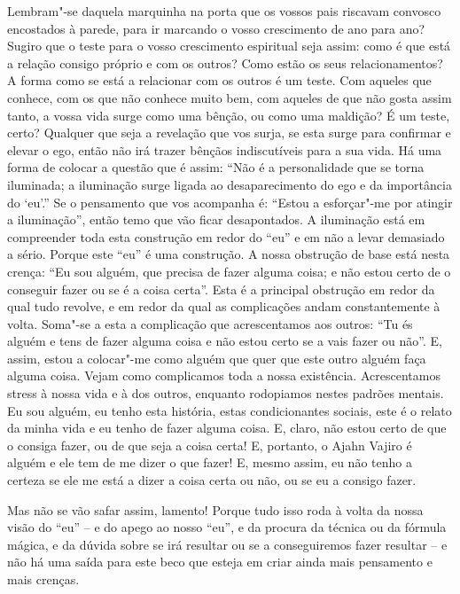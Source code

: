 Lembram"-se daquela marquinha na porta que os vossos pais riscavam convosco
encostados à parede, para ir marcando o vosso crescimento de ano para ano?
Sugiro que o teste para o vosso crescimento espiritual seja assim: como é que
está a relação consigo próprio e com os outros? Como estão os seus
relacionamentos? A forma como se está a relacionar com os outros é um teste. Com
aqueles que conhece, com os que não conhece muito bem, com aqueles de que não
gosta assim tanto, a vossa vida surge como uma bênção, ou como uma maldição? É
um teste, certo? Qualquer que seja a revelação que vos surja, se esta surge para
confirmar e elevar o ego, então não irá trazer bênçãos indiscutíveis para a sua
vida. Há uma forma de colocar a questão que é assim: ``Não é a personalidade que
se torna iluminada; a iluminação surge ligada ao desaparecimento do ego e da
importância do `eu'.'' Se o pensamento que vos acompanha é: ``Estou a
esforçar"-me por atingir a iluminação'', então temo que vão ficar desapontados. A
iluminação está em compreender toda esta construção em redor do ``eu'' e em não
a levar demasiado a sério. Porque este ``eu'' é uma construção. A nossa
obstrução de base está nesta crença: ``Eu sou alguém, que precisa de fazer
alguma coisa; e não estou certo de o conseguir fazer ou se é a coisa certa''.
Esta é a principal obstrução em redor da qual tudo revolve, e em redor da qual
as complicações andam constantemente à volta. Soma"-se a esta a complicação que
acrescentamos aos outros: ``Tu és alguém e tens de fazer alguma coisa e não
estou certo se a vais fazer ou não''. E, assim, estou a colocar"-me como alguém
que quer que este outro alguém faça alguma coisa. Vejam como complicamos toda a
nossa existência. Acrescentamos stress à nossa vida e à dos outros, enquanto
rodopiamos nestes padrões mentais. Eu sou alguém, eu tenho esta história, estas
condicionantes sociais, este é o relato da minha vida e eu tenho de fazer alguma
coisa. E, claro, não estou certo de que o consiga fazer, ou de que seja a coisa
certa! E, portanto, o Ajahn Vajiro é alguém e ele tem de me dizer o que fazer!
E, mesmo assim, eu não tenho a certeza se ele me está a dizer a coisa certa ou
não, ou se eu a consigo fazer.

Mas não se vão safar assim, lamento! Porque tudo isso roda à volta da nossa
visão do ``eu'' -- e do apego ao nosso ``eu'', e da procura da técnica ou da
fórmula mágica, e da dúvida sobre se irá resultar ou se a conseguiremos fazer
resultar -- e não há uma saída para este beco que esteja em criar ainda mais
pensamento e mais crenças.

